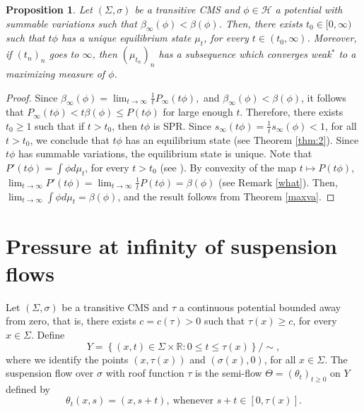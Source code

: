 \documentclass[letterpaper,11pt]{amsart}
\theoremstyle{plain}
\theoremstyle{plain}
\newtheorem{proposition}{Proposition}[subsection]
\theoremstyle{definition}
\theoremstyle{remark}
\def\R{{\mathbb R}}
\def\H{{\mathcal H}}
\begin{document}
\begin{proposition}\label{fv1}  Let $(\Sigma,\sigma)$ be a transitive CMS and $\phi\in \H$ a potential with summable variations such that $\beta_\infty(\phi)<\beta(\phi)$. Then, there exists $t_0\in [0,\infty)$ such that $t\phi$ has a unique equilibrium state $\mu_t$, for every $t\in (t_0,\infty)$. Moreover, if $(t_n)_n$ goes to $\infty$, then $(\mu_{t_n})_n$ has a subsequence which converges weak$^*$ to a maximizing measure of $\phi$. 
\end{proposition}

\begin{proof} Since $\beta_\infty(\phi)=\lim_{t\to\infty}\frac{1}{t}P_\infty(t\phi),$ and $\beta_\infty(\phi)<\beta(\phi)$, it follows that $P_\infty(t\phi)< t\beta(\phi)\le P(t\phi)$ for large enough $t$. Therefore, there exists $t_0\ge 1$ such that if $t>t_0$, then $t\phi$ is SPR. Since $s_\infty(t\phi)=\frac{1}{t}s_\infty(\phi)<1$, for all $t>t_0$, we conclude that $t\phi$ has an equilibrium state (see Theorem \ref{thm:2}). Since $t\phi$ has summable variations, the equilibrium state is unique.   Note that $P'(t\phi)=\int \phi d\mu_t$, for every $t>t_0$ (see \cite{sa2}). By convexity of the map $t\mapsto P(t\phi)$, $\lim_{t\to\infty}P'(t\phi)=\lim_{t\to\infty}\frac{1}{t}P(t\phi)=\beta(\phi)$ (see Remark \ref{what}). Then, $\lim_{t\to\infty}\int \phi d\mu_t=\beta(\phi)$, and the result follows from Theorem \ref{maxva}.
\end{proof}






\section{Pressure at infinity of suspension flows}\label{sec:flow}
 Let $(\Sigma, \sigma)$ be a transitive CMS and $\tau$ a continuous potential  bounded away from zero, that is, there exists $c=c(\tau)>0$ such that $\tau(x)\ge c$, for every $x\in \Sigma$.  Define
\begin{equation*} 
Y= \left\{ (x,t)\in \Sigma  \times \R \colon 0 \le t \le\tau(x) \right\}/\sim,
\end{equation*}
where we identify the points $(x,\tau(x))$ and $(\sigma(x),0)$, for all $x\in \Sigma $. The suspension flow over $\sigma$
with roof function $\tau$ is the semi-flow $\Theta = (
\theta_t)_{t \ge 0}$ on $Y$ defined by
\begin{equation*}
 \theta_t(x,s)= (x,s+t), \ \text{whenever $s+t\in[0,\tau(x)]$.}
\end{equation*} 
\end{document}
